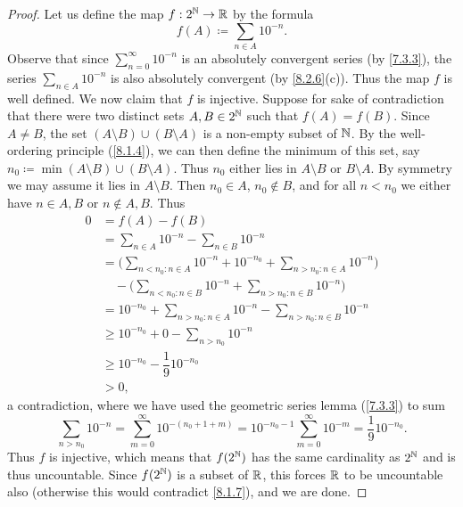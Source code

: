 \begin{proof}
  Let us define the map \(f : 2^{\mathbb{N}} \to \mathbb{R}\) by the formula
  \[
    f(A) \coloneqq \sum_{n \in A} 10^{-n}.
  \]
  Observe that since \(\sum_{n = 0}^\infty 10^{-n}\) is an absolutely convergent series (by \cref{7.3.3}), the series \(\sum_{n \in A} 10^{-n}\) is also absolutely convergent (by \cref{8.2.6}(c)).
  Thus the map \(f\)  is well defined.
  We now claim that \(f\) is injective.
  Suppose for sake of contradiction that there were two distinct sets \(A, B \in 2^{\mathbb{N}}\) such that \(f(A) = f(B)\).
  Since \(A \neq B\), the set \((A \setminus B) \cup (B \setminus A)\) is a non-empty subset of \(\mathbb{N}\).
  By the well-ordering principle (\cref{8.1.4}), we can then define the minimum of this set, say \(n_0 \coloneqq \min(A \setminus B) \cup (B \setminus A)\).
  Thus \(n_0\) either lies in \(A \setminus B\) or \(B \setminus A\).
  By symmetry we may assume it lies in \(A \setminus B\).
  Then \(n_0 \in A\), \(n_0 \notin B\), and for all \(n < n_0\) we either have \(n \in A, B\) or \(n \notin A, B\).
  Thus
  \begin{align*}
    0 & = f(A) - f(B)                                                                                 \\
      & = \sum_{n \in A} 10^{-n} - \sum_{n \in B} 10^{-n}                                             \\
      & = \Bigg(\sum_{n < n_0 : n \in A} 10^{-n} + 10^{-n_0} + \sum_{n > n_0 : n \in A} 10^{-n}\Bigg) \\
      & \quad - \Bigg(\sum_{n < n_0 : n \in B} 10^{-n} + \sum_{n > n_0 : n \in B} 10^{-n}\Bigg)       \\
      & = 10^{-n_0} + \sum_{n > n_0 : n \in A} 10^{-n} - \sum_{n > n_0 : n \in B} 10^{-n}             \\
      & \geq 10^{-n_0} + 0 - \sum_{n > n_0} 10^{-n}                                                   \\
      & \geq 10^{-n_0} - \dfrac{1}{9} 10^{-n_0}                                                       \\
      & > 0,
  \end{align*}
  a contradiction, where we have used the geometric series lemma (\cref{7.3.3}) to sum
  \[
    \sum_{n > n_0} 10^{-n} = \sum_{m = 0}^\infty 10^{-(n_0 + 1 + m)} = 10^{-n_0 - 1} \sum_{m = 0}^\infty 10^{-m} = \dfrac{1}{9} 10^{-n_0}.
  \]
  Thus \(f\) is injective, which means that \(f(2^{\mathbb{N}})\) has the same cardinality as \(2^{\mathbb{N}}\) and is thus uncountable.
  Since \(f(2^{\mathbb{N}})\) is a subset of \(\mathbb{R}\), this forces \(\mathbb{R}\) to be uncountable also (otherwise this would contradict \cref{8.1.7}), and we are done.
\end{proof}

